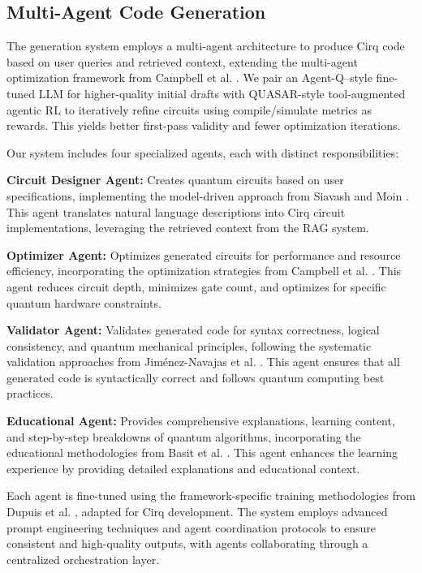 \documentclass[runningheads]{llncs}
\begin{document}
\subsection{Multi-Agent Code Generation}
The generation system employs a multi-agent architecture to produce Cirq code based on user queries and retrieved context, extending the multi-agent optimization framework from Campbell et al. \cite{campbell2025enhancingllmbasedquantumcode}. We pair an Agent-Q–style fine-tuned LLM for higher-quality initial drafts \cite{jern2025agentqfinetuninglargelanguage} with QUASAR-style tool-augmented agentic RL \cite{yu2025quasarquantumassemblycode} to iteratively refine circuits using compile/simulate metrics as rewards. This yields better first-pass validity and fewer optimization iterations.

Our system includes four specialized agents, each with distinct responsibilities:

\textbf{Circuit Designer Agent:} Creates quantum circuits based on user specifications, implementing the model-driven approach from Siavash and Moin \cite{siavash2025modeldrivenquantumcodegeneration}. This agent translates natural language descriptions into Cirq circuit implementations, leveraging the retrieved context from the RAG system.

\textbf{Optimizer Agent:} Optimizes generated circuits for performance and resource efficiency, incorporating the optimization strategies from Campbell et al. \cite{campbell2025enhancingllmbasedquantumcode}. This agent reduces circuit depth, minimizes gate count, and optimizes for specific quantum hardware constraints.

\textbf{Validator Agent:} Validates generated code for syntax correctness, logical consistency, and quantum mechanical principles, following the systematic validation approaches from Jiménez-Navajas et al. \cite{jimenez2025codegeneration}. This agent ensures that all generated code is syntactically correct and follows quantum computing best practices.

\textbf{Educational Agent:} Provides comprehensive explanations, learning content, and step-by-step breakdowns of quantum algorithms, incorporating the educational methodologies from Basit et al. \cite{basit2025pennylangpioneeringllmbasedquantum}. This agent enhances the learning experience by providing detailed explanations and educational context.

Each agent is fine-tuned using the framework-specific training methodologies from Dupuis et al. \cite{10691762}, adapted for Cirq development. The system employs advanced prompt engineering techniques and agent coordination protocols to ensure consistent and high-quality outputs, with agents collaborating through a centralized orchestration layer.
\end{document}
